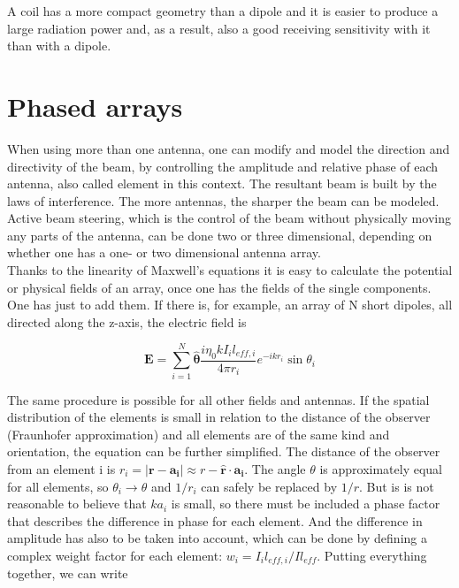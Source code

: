 \documentclass[a4paper,14pt]{extbook}
\begin{document}
A coil has a more compact geometry than a dipole and it is easier to produce a large radiation power and, as a result, also a good receiving sensitivity with it than with a dipole.

\section{Phased arrays}

When using more than one antenna, one can modify and model the direction and directivity of the beam, by controlling the amplitude and relative phase of each antenna, also called element in this context. The resultant beam is built by the laws of interference. The more antennas, the sharper the beam can be modeled. Active beam steering, which is the control of the beam without physically moving any parts of the antenna, can be done two or three dimensional, depending on whether one has a one- or two dimensional antenna array.\\

Thanks to the linearity of Maxwell's equations it is easy to calculate the potential or physical fields of an array, once one has the fields of the single components. One has just to add them. If there is, for example, an array of N short dipoles, all directed along the z-axis, the electric field is

\begin{equation}\label{Eff_array}
\mathbf{E} = \sum_{i=1}^N\mathbf{ \hat{\theta} }\frac{i \eta_0 k I_i l_{eff,i}}{4 \pi r_i} e^{-ikr_i } \sin \theta_i
\end{equation}

The same procedure is possible for all other fields and antennas. If the spatial distribution of the elements is small in relation to the distance of the observer (Fraunhofer approximation) and all elements are of the same kind and orientation, the equation can be further simplified. The distance of the observer from an element i is $r_i=|\mathbf{r}-\mathbf{a_i}|\approx r-\mathbf{\hat{r}} \cdot \mathbf{a_i} $. The angle $\theta$ is approximately equal for all elements, so $\theta_i \rightarrow \theta$ and $1/r_i$ can safely be replaced by $1/r$. But is is not reasonable to believe that $ka_i$ is small, so there must be included a phase factor that describes the difference in phase for each element. And the difference in amplitude has also to be taken into account, which can be done by defining a complex weight factor for each element: $w_i=I_il_{eff,i}/Il_{eff}$. Putting everything together, we can write
\end{document}
